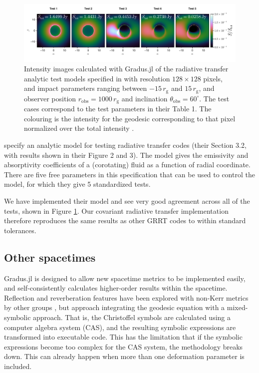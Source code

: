 \documentclass[fleqn,usenatbib]{mnras}
\newcommand{\Gradus}{Gradus.jl\xspace}
\newcommand{\rg}{r_\text{g}}
\begin{document}
\begin{figure}
	\centering
	\includegraphics[width=0.99\linewidth]{figures/radiative-transfer.gold.pdf}
	\caption{Intensity images calculated with \Gradus of the radiative transfer analytic test models specified in \citet{gold_verification_2020} with resolution $128 \times 128$ pixels, and impact parameters ranging between $-15\, \rg$ and $15\, \rg$, and observer position $r_\text{obs} = 1000\, \rg$ and inclination $\theta_\text{obs} = 60^\circ$. The test cases correspond to the test parameters in their Table 1. The colouring is the intensity for the geodesic corresponding to that pixel normalized over the total intensity .}
	\label{fig:gold-test-problems}
\end{figure}

\cite{gold_verification_2020} specify an analytic model for testing radiative
transfer codes (their Section 3.2, with results shown in their Figure 2 and 3).
The model gives the emissivity and absorptivity coefficients of a (corotating)
fluid as a function of radial coordinate. There are five free parameters in this
specification that can be used to control the model, for which they give 5
standardized tests.

We have implemented their model and see very good agreement across all of the
tests, shown in Figure \ref{fig:gold-test-problems}. Our covariant radiative
transfer implementation therefore reproduces the same results as other GRRT
codes to within standard tolerances.

\subsection{Other spacetimes}

\Gradus is designed to allow new spacetime metrics to be implemented easily, and
self-consistently calculates higher-order results within the spacetime.
Reflection and reverberation features have been explored with non-Kerr metrics
by other groups \citep[e.g.,][]{jiang_non_kerr_2016,bambi_non_kerr_2023}, but approach integrating the
geodesic equation with a mixed-symbolic approach. That is, the Christoffel
symbols are calculated using a computer algebra system (CAS), and the resulting
symbolic expressions are transformed into executable code. This has the
limitation that if the symbolic expressions become too complex for the CAS
system, the methodology breaks down. This can already happen when more than one
deformation parameter is included.
\end{document}
